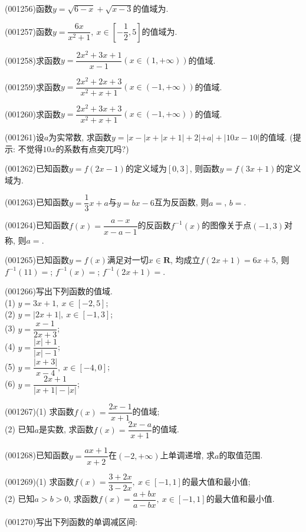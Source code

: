 \item (001256)函数$y=\sqrt{6-x}+\sqrt{x-3}$的值域为.
\item (001257)函数$y=\dfrac{6x}{x^2+1}, \ x \in [-\dfrac{1}{2},5]$的值域为.
\item (001258)求函数$y=\dfrac{2x^2+3x+1}{x-1}(x\in(1,+\infty))$的值域.
\item (001259)求函数$y=\dfrac{2x^2+2x+3}{x^2+x+1}(x\in(-1,+\infty))$的值域.
\item (001260)求函数$y=\dfrac{2x^2+3x+3}{x^2+x+1}(x\in(-1,+\infty))$的值域.
\item (001261)设$a$为实常数, 求函数$y=|x-|x+|x+1|+2|+a|+|10x-10|$的值域. (提示: 不觉得$10x$的系数有点突兀吗?)
\item (001262)已知函数$y=f(2x-1)$的定义域为$[0,3]$, 则函数$y=f(3x+1)$的定义域为.
\item (001263)已知函数$y=\dfrac{1}{3}x+a$与$y=bx-6$互为反函数, 则$a=$, $b=$.
\item (001264)已知函数$f(x)=\dfrac{a-x}{x-a-1}$的反函数$f^{-1}(x)$的图像关于点$(-1,3)$对称, 则$a=$.
\item (001265)已知函数$y=f(x)$满足对一切$x \in\mathbf{R}$, 均成立$f(2x+1)=6x+5$, 则$f^{-1}(11)=$; $f^{-1}(x)=$; $f^{-1}(2x+1)=$.
\item (001266)写出下列函数的值域.\\ 
(1) $y=3x+1, \ x \in [-2,5]$; \\ 
(2) $y=|2x+1|, \ x \in [-1,3]$; \\ 
(3) $y=\dfrac{x-1}{2x+3}$; \\ 
(4) $y=\dfrac{|x|+1}{|x|-1}$; \\ 
(5) $y=\dfrac{|x+3|}{x-4}, \ x \in [-4,0]$; \\ 
(6) $y=\dfrac{2x+1}{|x+1|-|x|}$; 
\item (001267)(1) 求函数$f(x)=\dfrac{2x-1}{x+1}$的值域;\\ 
(2) 已知$a$是实数, 求函数$f(x)=\dfrac{2x-a}{x+1}$的值域.
\item (001268)已知函数$y=\dfrac{ax+1}{x+2}$在$(-2,+\infty)$上单调递增, 求$a$的取值范围.
\item (001269)(1) 求函数$f(x)=\dfrac{3+2x}{3-2x}, \ x \in [-1,1]$的最大值和最小值;\\ 
(2) 已知$a>b>0$, 求函数$f(x)=\dfrac{a+bx}{a-bx}, \ x \in [-1,1]$的最大值和最小值.
\item (001270)写出下列函数的单调减区间:\\ 

